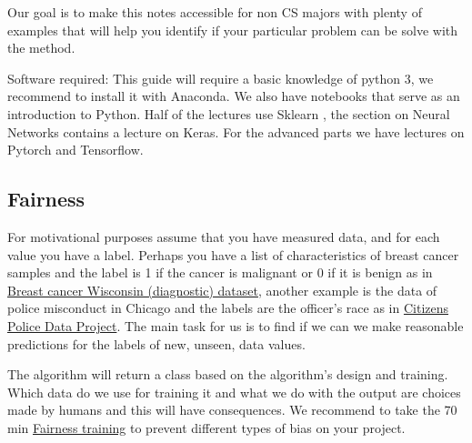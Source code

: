 \documentclass[11pt,letterpaper]{report}
\begin{document}
		Our goal is to make this notes accessible for non CS majors with plenty of examples that will help you identify if your particular problem can be solve with the method.
	
	Software required:
	This guide will require a basic knowledge of python 3, we recommend to install it with Anaconda. We also have notebooks that serve as an introduction to Python.
	Half of the lectures use  Sklearn \cite{Pedregosa2011}, the section on Neural Networks contains a lecture on Keras\cite{chollet2015keras}. For the advanced parts we have lectures on Pytorch\cite{paszke2017automatic} and  Tensorflow\cite{tensorflow2015-whitepaper}.
	
	
	
    \subsection{Fairness}
	For motivational purposes assume that you have measured data, and for each value you have a label. Perhaps you have a list of characteristics of breast cancer samples and the label is 1 if the cancer is malignant or 0 if it is benign as in \href{https://scikit-learn.org/stable/datasets/index.html#breast-cancer-dataset}{Breast cancer Wisconsin (diagnostic) dataset}\cite{wcancer}, another example is the data of police misconduct in Chicago and the labels are the officer's race as in \href{https://data.cpdp.co/data/L5rG3q/}{Citizens Police Data Project}\cite{wpolice}. The main task for us is to find if we can we make reasonable predictions for the labels of new, unseen, data values.

    The algorithm will return a class based on the algorithm's design and training. Which data do we use for training it and what we do with the output are choices made by humans and this will have consequences. We recommend to take the 70 min \href{https://developers.google.com/machine-learning/crash-course/fairness/video-lecture?utm_source=keyword-blog&utm_medium=blog&utm_campaign=mle-outreach&utm_term=&utm_content=mlcc-fairness}{Fairness training}\cite{wfair} to prevent different types of bias on your project. 
\end{document}

